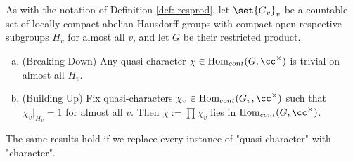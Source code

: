 \documentclass[11pt, x11names, openany]{book}
\begin{document}
\begin{lemma}
\label{lemma: characters on restricted products}
As with the notation of Definition \ref{def: resprod}, let $\set{G_v}_v$ be a countable set of locally-compact abelian Hausdorff groups with compact open respective subgroups $H_v$ for almost all $v$, and let $G$ be their restricted product. 
\begin{enumerate}[(a)]
    \item (Breaking Down) Any quasi-character $\chi \in \Hom_{cont}(G, \cc^\times)$ is trivial on almost all $H_v$.
    \item (Building Up) Fix quasi-characters $\chi_v \in \Hom_{cont}(G_v, \cc^\times)$ such that $\chi_v \vert_{H_v} = 1$ for almost all $v$. Then $\chi := \prod \chi_v$ lies in $\Hom_{cont}(G, \cc^\times)$.
\end{enumerate}
The same results hold if we replace every instance of "quasi-character" with "character".
\end{lemma}
\end{document}
